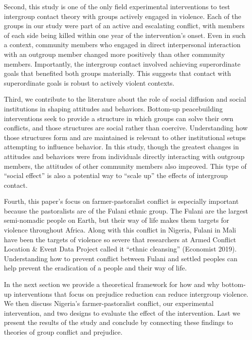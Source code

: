 \documentclass[11pt]{article}
\begin{document}
Second, this study is one of the only field experimental interventions
to test intergroup contact theory with groups actively engaged in
violence. Each of the groups in our study were part of an active and
escalating conflict, with members of each side being killed within one
year of the intervention's onset. Even in such a context, community
members who engaged in direct interpersonal interaction with an outgroup
member changed more positively than other community members.
Importantly, the intergroup contact involved achieving superordinate
goals that benefited both groups materially. This suggests that contact
with superordinate goals is robust to actively violent contexts.

Third, we contribute to the literature about the role of social
diffusion and social institutions in shaping attitudes and behaviors.
Bottom-up peacebuilding interventions seek to provide a structure in
which groups can solve their own conflicts, and those structures are
social rather than coercive. Understanding how those structures form and
are maintained is relevant to other institutional setups attempting to
influence behavior. In this study, though the greatest changes in
attitudes and behaviors were from individuals directly interacting with
outgroup members, the attitudes of other community members also
improved. This type of ``social effect'' is also a potential way to
``scale up'' the effects of intergroup contact.

Fourth, this paper's focus on farmer-pastoralist conflict is especially
important because the pastoralists are of the Fulani ethnic group. The
Fulani are the largest semi-nomadic people on Earth, but their way of
life makes them targets for violence throughout Africa. Along with this
conflict in Nigeria, Fulani in Mali have been the targets of violence so
severe that researchers at Armed Conflict Location \& Event Data Project
called it ``ethnic cleansing'' (Economist 2019). Understanding how to
prevent conflict between Fulani and settled peoples can help prevent the
eradication of a people and their way of life.

In the next section we provide a theoretical framework for how and why
bottom-up interventions that focus on prejudice reduction can reduce
intergroup violence. We then discuss Nigeria's farmer-pastoralist
conflict, our experimental intervention, and two designs to evaluate the
effect of the intervention. Last we present the results of the study and
conclude by connecting these findings to theories of group conflict and
prejudice.
\end{document}
